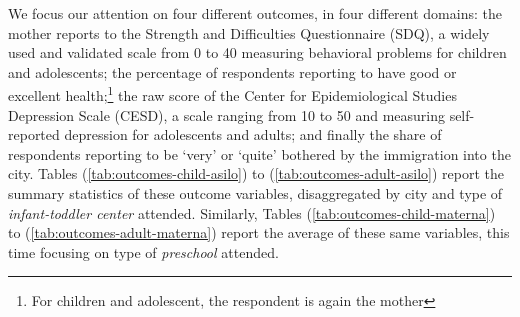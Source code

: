 We focus our attention on four different outcomes, in four different domains: the mother reports to the Strength and Difficulties Questionnaire (SDQ), a widely used and validated scale from 0 to 40 measuring behavioral problems for children and adolescents; the percentage of respondents reporting to have good or excellent health;\footnote{For children and adolescent, the respondent is again the mother} the raw score of the Center for Epidemiological Studies Depression Scale (CESD), a scale ranging from 10 to 50 and measuring self-reported depression for adolescents and adults; and finally the share of respondents reporting to be `very' or  `quite' bothered by the immigration into the city. Tables (\ref{tab:outcomes-child-asilo}) to (\ref{tab:outcomes-adult-asilo}) report the summary statistics of these outcome variables, disaggregated by city and type of \textit{infant-toddler center} attended. Similarly, Tables (\ref{tab:outcomes-child-materna}) to (\ref{tab:outcomes-adult-materna}) report the average of these same variables, this time focusing on type of \textit{preschool} attended. %


